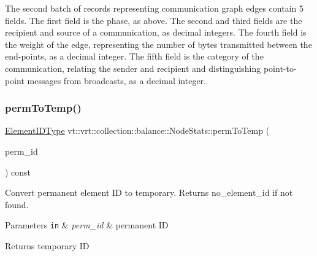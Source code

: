 The second batch of records representing communication graph edges contain 5 fields. The first field is the phase, as above. The second and third fields are the recipient and source of a communication, as decimal integers. The fourth field is the weight of the edge, representing the number of bytes transmitted between the end-\/points, as a decimal integer. The fifth field is the category of the communication, relating the sender and recipient and distinguishing point-\/to-\/point messages from broadcasts, as a decimal integer. \mbox{\label{structvt_1_1vrt_1_1collection_1_1balance_1_1_node_stats_a6e13d373b5365771b1f08fc0bd5c0bda}} 
\subsubsection{\texorpdfstring{perm\+To\+Temp()}{permToTemp()}}
{\footnotesize\ttfamily \hyperlink{namespacevt_1_1vrt_1_1collection_1_1balance_a14c8d2c972f2913aa3f1636e5be0a120}{Element\+I\+D\+Type} vt\+::vrt\+::collection\+::balance\+::\+Node\+Stats\+::perm\+To\+Temp (\begin{DoxyParamCaption}\item[{\hyperlink{namespacevt_1_1vrt_1_1collection_1_1balance_a14c8d2c972f2913aa3f1636e5be0a120}{Element\+I\+D\+Type}}]{perm\+\_\+id }\end{DoxyParamCaption}) const}



Convert permanent element ID to temporary. Returns {\ttfamily no\+\_\+element\+\_\+id} if not found. 


\begin{DoxyParams}[1]{Parameters}
\mbox{\tt in}  & {\em perm\+\_\+id} & permanent ID\\
\hline
\end{DoxyParams}
\begin{DoxyReturn}{Returns}
temporary ID 
\end{DoxyReturn}
\mbox{\label{structvt_1_1vrt_1_1collection_1_1balance_1_1_node_stats_a517e67b5ada69873ab40d5f6e007a818}} 
